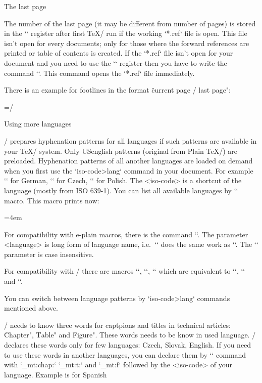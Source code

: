 {\sec The last page

The number of the last page (it may be different from number of pages) is
stored in the `\lastpage` register after first \TeX/ run if the working `*.ref` 
file is open. This file isn't open for every documents; only for those
where the forward references are printed or table of contents is created.
If the `*.ref` file isn't open for your document and you need to use the
`\lastpage` register then you have to write the command `\openref`. This command opens
the `*.ref` file immediately.

There is an example for footlines in the format \"current page / last page": 

\begtt
\footline={\hss \rm \thefontsize[10]\the\pageno/\the\lastpage \hss}
\endtt


\sec Using more languages

\OpTeX/ prepares hyphenation patterns for all languages if such patterns are
available in your \TeX/ system. 
\new
Only USenglish patterns (original from Plain \TeX/) are preloaded.
Hyphenation patterns of all another languages are loaded on demand when you first use
the `\<iso-code>lang` command in your document. 
For example `\delang` for German, `\cslang` for
Czech, `\pllang` for Polish. The <iso-code> is a shortcut 
of the language (mostly from ISO 639-1). 
You can list all available languages by `\langlist` 
macro. This macro prints now:

\medskip
{\typosize[9/11.5]\emergencystretch=4em 
\noindent \langlist
\par}
\medskip

\new
For compatibility with e-plain macros, there is the command
``. The parameter <language> is long form of
language name, i.e.\ `` does the same work as `\cslang`.
The `\uselanguage` parameter is case insensitive.

For compatibility with \csplain/ there are macros `\ehyph`, `\chyph`,
`\shyph` which are equivalent to `\enlang`, `\cslang` and `\sklang`.

You can switch between language patterns by `\<iso-code>lang` commands mentioned
above.

\OpTeX/ needs to know three words for captpions and titles in technical
articles: \"Chapter", \"Table" and \"Figure". These words needs to be know
in used language. \OpTeX/ declares these words only for few languages:
Czech, Slovak, English. If you need to use these words in another languages,
you can declare them by `\sdef` command 
\new
with `_mt:chap:` `_mt:t:` and `_mt:f`
followed by the <iso-code> of your language. Example is for Spanish


}
